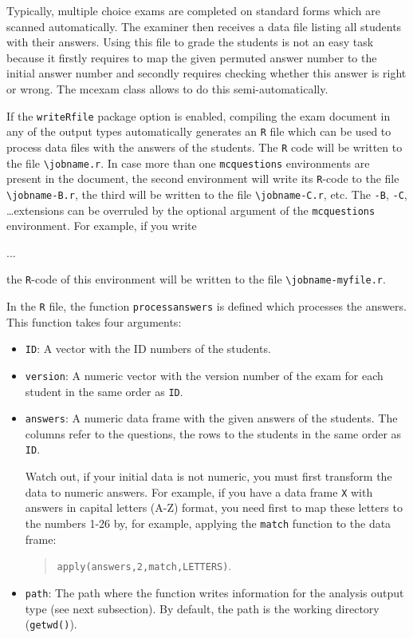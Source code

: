 \documentclass{article}
\begin{document}
Typically, multiple choice exams are completed on standard forms which are scanned automatically. The examiner then receives a data file listing all students with their answers. Using this file to grade the students is not an easy task because it firstly requires to map the given permuted answer number to the initial answer number and secondly requires checking whether this answer is right or wrong. The \textsf{mcexam} class allows to do this semi-automatically.

If the \verb$writeRfile$ package option is enabled, compiling the exam document in any of the output types automatically generates an \verb$R$ file which can be used to process data files with the answers of the students. The \verb$R$ code will be written to the file \verb$\jobname.r$. In case more than one \verb$mcquestions$ environments are present in the document, the second environment will write its \verb$R$-code to the file \verb$\jobname-B.r$, the third will be written to the file \verb$\jobname-C.r$, etc. The \verb$-B$, \verb$-C$, \ldots extensions can be overruled by the optional argument of the \verb$mcquestions$ environment. For example, if you write
\begin{code}
\begin{mcquestions}[myfile]
...
\end{mcquestions}
\end{code}
the \verb$R$-code of this environment will be written to the file \verb$\jobname-myfile.r$.

In the \verb$R$ file, the function \verb$processanswers$ is defined which processes the answers. This function takes four arguments:
\begin{itemize}
 \item \verb$ID$: 
       A vector with the ID numbers of the students.
 \item \verb$version$: 
       A numeric vector with the version number of the exam for each student in the same order as \verb$ID$.
 \item \verb$answers$: 
       A numeric data frame with the given answers of the students. The columns refer to the questions, the rows to the students in the same order as \verb$ID$. 
       
       Watch out, if your initial data is not numeric, you must first transform the data to numeric answers. For example, if you have a data frame \verb$X$ with answers in capital letters (A-Z) format, you need first to map these letters to the numbers 1-26 by, for example, applying the \verb$match$ function to the data frame:
       \begin{quote}
        \verb$apply(answers,2,match,LETTERS)$.
       \end{quote}
 \item \verb$path$: 
       The path where the function writes information for the analysis output type (see next subsection). By default, the path is the working directory (\verb$getwd()$).
\end{itemize}
\end{document}
